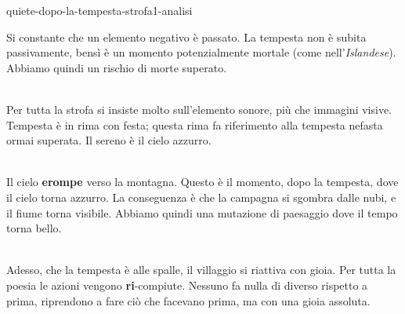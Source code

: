 \documentclass[preview]{standalone}
\begin{document}
\begin{snippet}{quiete-dopo-la-tempesta-strofa1-analisi}

    Si constante che un elemento negativo è passato.
    La tempesta non è subita passivamente, bensì è un momento potenzialmente mortale
    (come nell'\textit{Islandese}). Abbiamo quindi un rischio di morte superato.
    \\\\

    Per tutta la strofa si insiste molto sull'elemento sonore, più che immagini visive.
    Tempesta è in rima con festa; questa rima fa riferimento alla tempesta nefasta ormai superata.
    Il sereno è il cielo azzurro.
    \\\\

    Il cielo \textbf{erompe} verso la montagna.
    Questo è il momento, dopo la tempesta, dove il cielo torna azzurro.
    La conseguenza è che la campagna si sgombra dalle nubi, e il fiume torna visibile.
    Abbiamo quindi una mutazione di paesaggio dove il tempo torna bello.
    \\\\

    Adesso, che la tempesta è alle spalle, il villaggio si riattiva con gioia.
    Per tutta la poesia le azioni vengono \textbf{ri}-compiute.
    Nessuno fa nulla di diverso rispetto a prima, riprendono a fare ciò che facevano prima,
    ma con una gioia assoluta.
    \\\\


\end{snippet}
\end{document}
